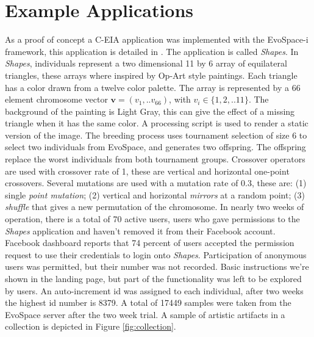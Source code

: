 \documentclass{sig-alternate}
\begin{document}
\section{Example Applications}
As a proof of concept a C-EIA application was implemented with the EvoSpace-i framework, this application is detailed in \cite{Musart}. The application is called \emph{Shapes}. In \emph{Shapes}, individuals represent a two dimensional 11 by 6 array of equilateral triangles, these arrays where inspired by Op-Art style paintings.
Each triangle has a color drawn from a twelve color palette.
The array is represented by a 66 element chromosome vector $\mathbf{v}=(v_1,..v_{66})$, with $v_i \in \{ 1,2,..11 \}$.
The background of the painting is Light Gray, this can give the effect of a missing triangle when it has the same color.
A processing script is used to render a static version of the image.
The breeding process uses tournament selection of size 6 to select two individuals from EvoSpace,
and generates two offspring.
The offspring replace the worst individuals from both tournament groups.
Crossover operators are used with crossover rate of 1, these are vertical and horizontal one-point crossovers.
Several mutations are used with a mutation rate of 0.3, these are:
(1) single \emph{point mutation}; (2) vertical and horizontal \emph{mirrors} at a random point;
(3) \emph{shuffle} that gives a new permutation of the chromosome.
In nearly two weeks of operation, there is a total of 70 active users, users who gave permissions to the \emph{Shapes} application and haven't
removed it from their Facebook account.
Facebook dashboard reports that 74 percent of users accepted the permission request to use their credentials to login onto \emph{Shapes}.
Participation of anonymous users was permitted, but their number was not recorded.
Basic instructions we're shown in the landing page, but part of the functionality was left to be explored by users.
An auto-increment id was assigned to each individual, after two weeks the highest id number is 8379.
A total of 17449 samples were taken from the EvoSpace server after the two week trial. A sample of artistic artifacts in a collection is depicted in Figure \ref{fig:collection}.
\end{document}
